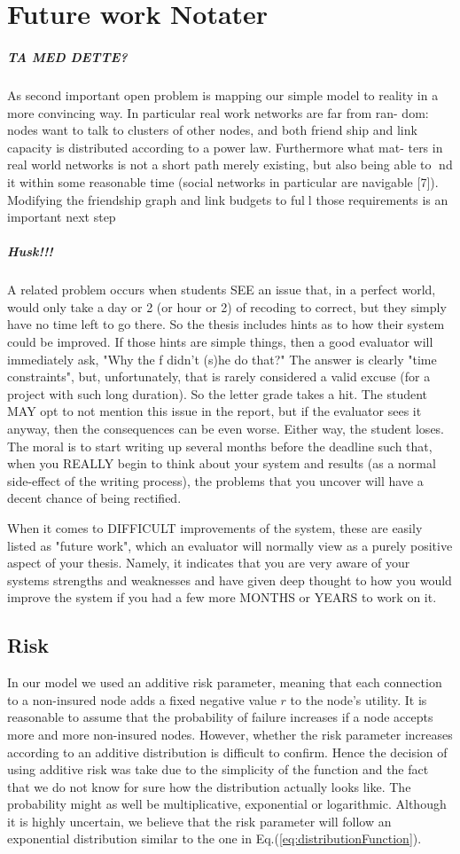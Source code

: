 \section{Future work Notater}
\label{chp:futurework} 
\subparagraph{TA MED DETTE?}
As second important open problem is mapping our simple model to reality
in a more convincing way. In particular real work networks are far from ran-
dom: nodes want to talk to clusters of other nodes, and both friend ship and
link capacity is distributed according to a power law. Furthermore what mat-
ters in real world networks is not a short path merely existing, but also being
able to nd it within some reasonable time (social networks in particular are
navigable [7]). Modifying the friendship graph and link budgets to full those
requirements is an important next step

\subparagraph{Husk!!!}
A related problem occurs when students SEE an issue that, in a perfect world, would only take a day or 2 (or hour or 2) of recoding to correct, but they simply have no time left to go there. So the thesis includes hints as to how their system could be improved. If those hints are simple things, then a good evaluator will immediately ask, "Why the f didn't (s)he do that?" The answer is clearly "time constraints", but, unfortunately, that is rarely considered a valid excuse (for a project with such long duration). So the letter grade takes a hit. The student MAY opt to not mention this issue in the report, but if the evaluator sees it anyway, then the consequences can be even worse. Either way, the student loses. The moral is to start writing up several months before the deadline such that, when you REALLY begin to think about your system and results (as a normal side-effect of the writing process), the problems that you uncover will have a decent chance of being rectified.

When it comes to DIFFICULT improvements of the system, these are easily listed as "future work", which an evaluator will normally view as a purely positive aspect of your thesis. Namely, it indicates that you are very aware of your systems strengths and weaknesses and have given deep thought to how you would improve the system if you had a few more MONTHS or YEARS to work on it.
\subsection{Risk}
In our model we used an additive risk parameter, meaning that each connection to a non-insured node adds a fixed negative value $r$ to the node's utility. It is reasonable to assume that the probability of failure increases if a node accepts more and more non-insured nodes. However, whether the risk parameter increases according to an additive distribution is difficult to confirm. Hence the decision of using additive risk was take due to the simplicity of the function and the fact that we do not know for sure how the distribution actually looks like. The probability might as well be multiplicative, exponential or logarithmic. Although it is highly uncertain, we believe that the risk parameter will follow an exponential distribution similar to the one in Eq.(\ref{eq:distributionFunction}).

